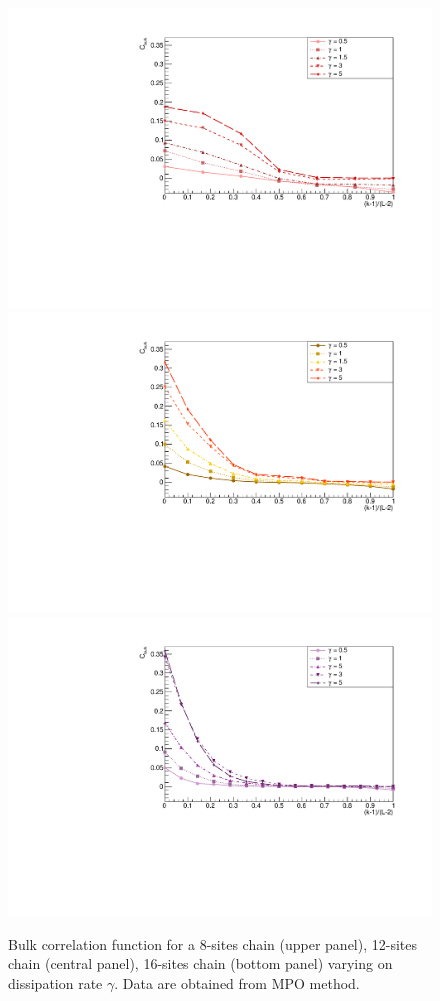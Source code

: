 \begin{figure}[H]
\centering
    \includegraphics[scale=0.55]{Figures/8sites_BulkCF_CONNvsGamma.pdf}
    \includegraphics[scale=0.55]{Figures/12sites_CFBulkCONNVSgamma.pdf}
    \includegraphics[scale=0.55]{Figures/16sites_CFBulkCONNVSgamma.pdf}
\captionsetup{width=1.\linewidth}
\caption{Bulk correlation function for a 8-sites chain (upper panel), 12-sites chain (central panel), 16-sites chain (bottom panel) varying on dissipation rate $\gamma$. Data are obtained from MPO method.}
\label{fig:BulkCFvsGamma3panelsSizes}
\end{figure}

